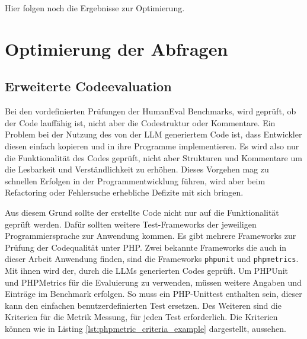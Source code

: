
\begin{tcolorbox}[
	enhanced,
	colback=red!5!white,
	colframe=red!75!black!50,
	title= Mein roter Faden
	]
	Hier folgen noch die Ergebnisse zur Optimierung.
\end{tcolorbox}



\section{Optimierung der Abfragen}


\subsection{Erweiterte Codeevaluation}
Bei den vordefinierten Prüfungen der HumanEval Benchmarks, wird geprüft, ob der Code lauffähig ist, nicht aber die Codestruktur oder Kommentare. Ein Problem bei der Nutzung des von der LLM generiertem Code ist, dass Entwickler diesen einfach kopieren und in ihre Programme implementieren. Es wird also nur die Funktionalität des Codes geprüft, nicht aber Strukturen und Kommentare um die Lesbarkeit und Verständlichkeit zu erhöhen. Dieses Vorgehen mag zu schnellen Erfolgen in der Programmentwicklung führen, wird aber beim Refactoring oder Fehlersuche erhebliche Defizite mit sich bringen.\vspace{0.2cm}

Aus diesem Grund sollte der erstellte Code nicht nur auf die Funktionalität geprüft werden. Dafür sollten weitere Test-Frameworks der jeweiligen Programmiersprache zur Anwendung kommen. Es gibt mehrere Frameworks zur Prüfung der Codequalität unter PHP. Zwei bekannte Frameworks die auch in dieser Arbeit Anwendung finden, sind die Frameworks \texttt{phpunit} und \texttt{phpmetrics}. Mit ihnen wird der, durch die LLMs generierten Codes geprüft.\vspace{0.2cm}
Um PHPUnit und PHPMetrics für die Evaluierung zu verwenden, müssen weitere Angaben und Einträge im Benchmark erfolgen. So muss ein PHP-Unittest enthalten sein, dieser kann den einfachen benutzerdefinierten Test ersetzen. Des Weiteren sind die Kriterien für die Metrik Messung, für jeden Test erforderlich. Die Kriterien können wie in Listing \ref{lst:phpmetric_criteria_example} dargestellt, aussehen.

